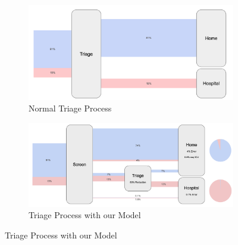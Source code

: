 \begin{figure}[H]
\caption{Triage Process}
\label{fig:triage_process}
\centering
\begin{subfigure}{.8\textwidth}
  \centering
  \caption{Normal Triage Process }
  \includegraphics[width=\linewidth]{img/evaluation/triage_before.png}
\end{subfigure}%
\qquad
\begin{subfigure}{.8\textwidth}
  \centering
  \caption{Triage Process with our Model}
  \includegraphics[width=\linewidth]{img/evaluation/triage_after.png}
\end{subfigure}
\end{figure}
